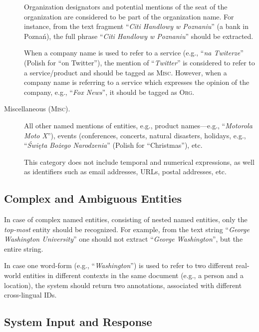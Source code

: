 \documentclass[11pt]{article}
\begin{document}
\begin{description}
  Organization designators and potential mentions of the seat of the organization are
  considered to be part of the organization name. For instance, from the text fragment
  ``\textit{Citi Handlowy w Poznaniu}'' (a bank in Poznań), the full phrase ``\textit{Citi
    Handlowy w Poznaniu}'' should be extracted.
			
  When a company name is used to refer to a service (e.g., ``\textit{na Twiterze}'' (Polish
  for ``on Twitter''), the mention of ``\textit{Twitter}'' is considered to refer to a
  service/product and should be tagged as \textsc{Misc}.  However, when a company name is
  referring to a service which expresses the opinion of the company, e.g., ``\textit{Fox
    News}'', it should be tagged as \textsc{Org}.

\item[Miscellaneous (\textsc{Misc}).]

  All other named mentions of entities, e.g., product names---e.g., ``\textit{Motorola Moto
    X}''), events (conferences, concerts, natural disasters, holidays, e.g., ``\textit{Święta
    Bożego Narodzenia}'' (Polish for ``Christmas''), etc.

  This category does not include temporal and numerical expressions, as well as identifiers
  such as email addresses, URLs, postal addresses, etc.

\end{description}



\subsection{Complex and Ambiguous Entities}

In case of complex named entities, consisting of nested named entities, only the {\em
  top-most} entity should be recognized. For example, from the text string ``\textit{George
  Washington University}'' one should not extract ``\textit{George Washington}'', but the
entire string.

In case one word-form (e.g., ``\textit{Washington}'') is used to refer to two different
real-world entities in different contexts in the same document (e.g., a person and a
location), the system should return two annotations, associated with different cross-lingual
IDs.


\subsection{System Input and Response}
\label{sec:protocol}
\end{document}
